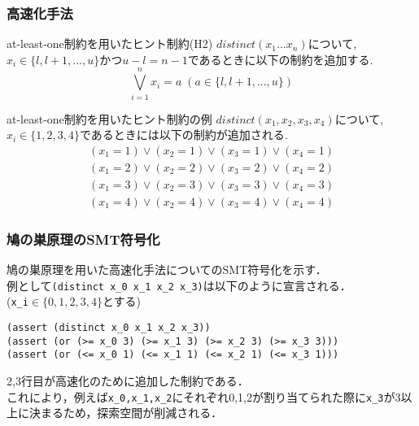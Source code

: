 \begin{frame}
    \frametitle{高速化手法}
    \vspace{-3mm}
    \begin{block}{at-least-one制約を用いたヒント制約(H2)}
        $distinct(x_1 ... x_n)$について, $x_i \in \{l, l+1, ..., u\}$かつ$u-l=n-1$であるときに以下の制約を追加する.\\
        \vspace{-3mm}
        $$\bigvee_{i=1}^n x_i=a \; (a \in \{l, l+1, ..., u\})$$
    \end{block}
    \begin{exampleblock}{at-least-one制約を用いたヒント制約の例}
        $distinct(x_1, x_2, x_3, x_4)$について, $x_i \in \{1, 2, 3, 4\}$であるときには以下の制約が追加される.
        \vspace{-3mm}
        \begin{eqnarray*}
            (x_1=1) \lor (x_2=1) \lor (x_3=1) \lor (x_4=1)\\
            (x_1=2) \lor (x_2=2) \lor (x_3=2) \lor (x_4=2)\\
            (x_1=3) \lor (x_2=3) \lor (x_3=3) \lor (x_4=3)\\
            (x_1=4) \lor (x_2=4) \lor (x_3=4) \lor (x_4=4)
        \end{eqnarray*}

    \end{exampleblock}
\end{frame}

\begin{frame}[fragile]\small
    \frametitle{鳩の巣原理のSMT符号化}
    鳩の巣原理を用いた高速化手法についてのSMT符号化を示す．\\
    例として\verb|(distinct x_0 x_1 x_2 x_3)|は以下のように宣言される．\\
    (\verb|x_i|$\in \{0,1,2,3,4\}$とする)
    \begin{exampleblock}{}\scriptsize
\begin{verbatim}
(assert (distinct x_0 x_1 x_2 x_3))
(assert (or (>= x_0 3) (>= x_1 3) (>= x_2 3) (>= x_3 3)))
(assert (or (<= x_0 1) (<= x_1 1) (<= x_2 1) (<= x_3 1)))
\end{verbatim}
    \end{exampleblock}
    2,3行目が高速化のために追加した制約である．\\
    これにより，例えば\verb|x_0,x_1,x_2|にそれぞれ0,1,2が割り当てられた際に\verb|x_3|が3以上に決まるため，探索空間が削減される．
\end{frame}


